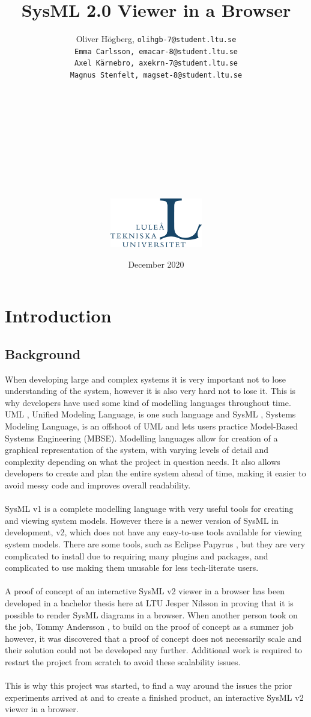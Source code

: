 \documentclass{article}
\title{SysML 2.0 Viewer in a Browser}
\author{Oliver Högberg, \tt olihgb-7@student.ltu.se \\ 
Emma Carlsson, \tt emacar-8@student.ltu.se \\ 
Axel Kärnebro, \tt axekrn-7@student.ltu.se \\ 
Magnus Stenfelt, \tt magset-8@student.ltu.se \\
\\
\\
\\
\\
\\
\\
\\
\\
\\
\\
\includegraphics[width=0.3\textwidth]{ltu_swe.jpg}}
\date{December 2020}
\begin{document}
\maketitle
\newpage
\tableofcontents
\newpage

\section{Introduction}

\subsection{Background}
When developing large and complex systems it is very important not to lose understanding of the system, however it is also very hard not to lose it. This is why developers have used some kind of modelling languages throughout time. UML \cite{UML}, Unified Modeling Language, is one such language and SysML \cite{SysML}, Systems Modeling Language, is an offshoot of UML and lets users practice Model-Based Systems Engineering \cite{MBSE} (MBSE). Modelling languages allow for creation of a graphical representation of the system, with varying levels of detail and complexity depending on what the project in question needs. It also allows developers to create and plan the entire system ahead of time, making it easier to avoid messy code and improves overall readability. 
\\ \\
SysML v1 is a complete modelling language with very useful tools for creating and viewing system models. However there is a newer version of SysML in development, v2, which does not have any easy-to-use tools available for viewing system models. There are some tools, such as Eclipse Papyrus \cite{EclipsePapyrus}, but they are very complicated to install due to requiring many plugins and packages, and complicated to use making them unusable for less tech-literate users.
\\ \\
A proof of concept of an interactive SysML v2 viewer in a browser has been developed in a bachelor thesis here at LTU Jesper Nilsson in \cite{Jesper2020} proving that it is possible to render SysML diagrams in a browser. When another person took on the job, Tommy Andersson \cite{Tommy2020}, to build on the proof of concept as a summer job however, it was discovered that a proof of concept does not necessarily scale and their solution could not be developed any further. Additional work is required to restart the project from scratch to avoid these scalability issues. 
\\ \\
This is why this project was started, to find a way around the issues the prior experiments arrived at and to create a finished product, an interactive SysML v2 viewer in a browser.
\end{document}

